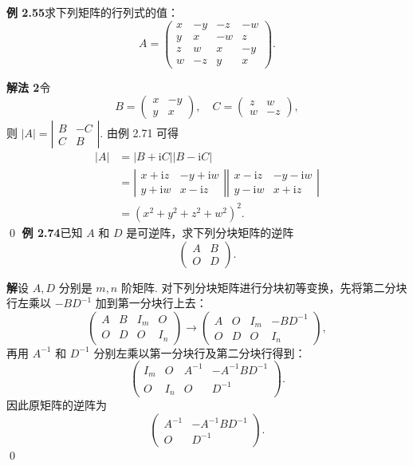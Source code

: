 \documentclass[UTF8,12pt,a4paper,fontset=fandol]{ctexart}
\begin{document}
\noindent\textbf{例 2.55}\quad 求下列矩阵的行列式的值：
\[
A=
\left(
\begin{array}{rrrr}
x & -y & -z & -w\\
y & x & -w & z\\
z & w & x & -y\\
w & -z & y & x
\end{array}
\right).
\]

\noindent\textbf{解法 2}\quad 令
\[
B=
\left(
\begin{array}{rr}
x & -y\\
y & x
\end{array}
\right),\quad
C=
\left(
\begin{array}{rr}
z & w\\
w & -z
\end{array}
\right),
\]
则 $|A|=
\left|
\begin{array}{cc}
B & -C\\
C & B
\end{array}
\right|$. 由例 2.71 可得
\[
\begin{aligned}
|A|
&=|B+\mathrm iC||B-\mathrm iC|\\
&=
\left|
\begin{array}{cc}
x+\mathrm iz & -y+\mathrm iw\\
y+\mathrm iw & x-\mathrm iz
\end{array}
\right|
\left|
\begin{array}{cc}
x-\mathrm iz & -y-\mathrm iw\\
y-\mathrm iw & x+\mathrm iz
\end{array}
\right|\\
&=(x^2+y^2+z^2+w^2)^2.
\end{aligned}
\]
\qed
\noindent\textbf{例 2.74}\quad 已知 $A$ 和 $D$ 是可逆阵，求下列分块矩阵的逆阵
\[
\left(
\begin{array}{cc}
A & B\\
O & D
\end{array}
\right).
\]

\noindent\textbf{解}\quad 设 $A,D$ 分别是 $m,n$ 阶矩阵. 对下列分块矩阵进行分块初等变换，先将第二分块行左乘以 $-BD^{-1}$ 加到第一分块行上去：
\[
\left(
\begin{array}{cc|cc}
A & B & I_m & O\\
O & D & O & I_n
\end{array}
\right)
\to
\left(
\begin{array}{cc|cc}
A & O & I_m & -BD^{-1}\\
O & D & O & I_n
\end{array}
\right),
\]
再用 $A^{-1}$ 和 $D^{-1}$ 分别左乘以第一分块行及第二分块行得到：
\[
\left(
\begin{array}{cc|cc}
I_m & O & A^{-1} & -A^{-1}BD^{-1}\\
O & I_n & O & D^{-1}
\end{array}
\right).
\]
因此原矩阵的逆阵为
\[
\left(
\begin{array}{cc}
A^{-1} & -A^{-1}BD^{-1}\\
O & D^{-1}
\end{array}
\right).
\]
\qed
\end{document}
